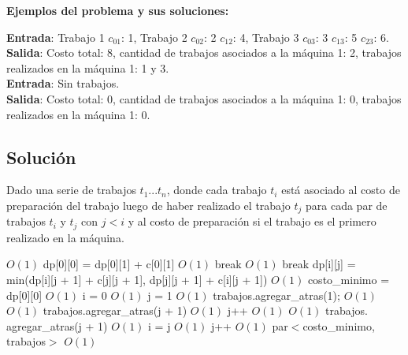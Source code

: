 \documentclass[a4paper, 10pt, twoside]{article}
\newenvironment{pseudo}[1][]{%
    \vspace{0.5em}%
    \begin{algorithmic}%
}
{%
    \end{algorithmic}%
    \vspace{0.5em}%
}
\newcommand{\Ode}[1]{\hfill $O(#1)$}
\begin{document}
\textbf{Ejemplos del problema y sus soluciones:}

\textbf{Entrada}: Trabajo 1 $c_{01}$: 1, Trabajo 2 $c_{02}$: 2 $c_{12}$: 4, Trabajo 3 $c_{03}$: 3 $c_{13}$: 5 $c_{23}$: 6. \\
\textbf{Salida}: Costo total: 8, cantidad de trabajos asociados a la máquina 1: 2, trabajos realizados en la máquina 1: 1 y 3. \\

\textbf{Entrada}: Sin trabajos. \\
\textbf{Salida}: Costo total: 0, cantidad de trabajos asociados a la máquina 1: 0, trabajos realizados en la máquina 1: 0. \\

\subsection{Solución}

Dado una serie de trabajos $t_1$...$t_n$, donde cada trabajo $t_i$ está asociado al costo de preparación del trabajo luego de haber realizado el trabajo $t_j$ para cada par de trabajos $t_i$ y $t_j$ con $j<i$ y al costo de preparación si el trabajo es el primero realizado en la máquina.

\begin{pseudo}
                             \Ode{1}
                \State dp[0][0] = dp[0][1] + c[0][1]  \Ode{1}
                \State break                          
            \EndIf
                                           \Ode{1}
                \State break
            \EndIf
            \State dp[i][j] = min(dp[i][j + 1] + c[j][j + 1], dp[j][j + 1] + c[i][j + 1])                          \Ode{1}
        \EndFor
    \EndFor
    \State costo\_minimo = dp[0][0]                    \Ode{1}
    \State i = 0                                       \Ode{1}
    \State j = 1                                       \Ode{1}
    \State trabajos$.$agregar\_atras(1);
            \Ode{1}
                \Ode{1}
            \State trabajos$.$agregar\_atras(j + 1)    \Ode{1}
            \State j++                                 \Ode{1}
            \EndIf
        \Else
                \Ode{1}
            \State trabajos$.$agregar\_atras(j + 1)    \Ode{1}
            \State i = j                               \Ode{1}  
            \State j++                                 \Ode{1}
            \EndIf
        \EndIf
    \EndWhile
    \Return par$<$costo\_minimo, trabajos$>$ \Ode{1}
    \EndProcedure
\end{pseudo}
\end{document}

